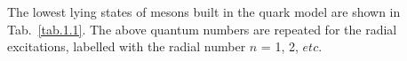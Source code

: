 The lowest lying states of mesons built in the quark model are shown in Tab.~\ref{tab.1.1}.
The above quantum numbers are repeated for the radial excitations, labelled with the radial number $n$ = 1, 2, $etc$.

